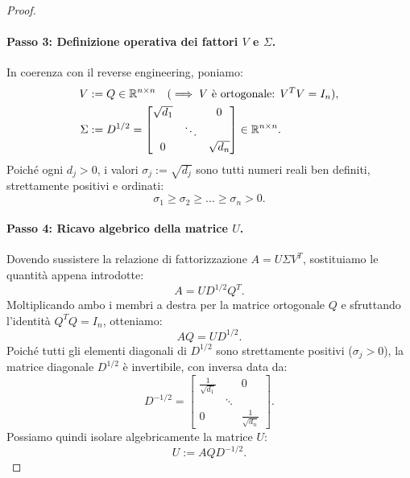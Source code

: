 \begin{proof}
\paragraph{Passo 3: Definizione operativa dei fattori $V$ e $\Sigma$.}
In coerenza con il reverse engineering, poniamo:
\begin{align}
    V &:= Q \in \mathbb{R}^{n \times n} \quad (\implies V \text{ \`e ortogonale: } V^T V = I_n), \\
    \Sigma &:= D^{1/2} = \begin{bmatrix}
        \sqrt{d_1} & & 0 \\
        & \ddots & \\
        0 & & \sqrt{d_n}
    \end{bmatrix} \in \mathbb{R}^{n \times n}.
\end{align}
Poich\'e ogni $d_j > 0$, i valori $\sigma_j := \sqrt{d_j}$ sono tutti numeri reali ben definiti, strettamente positivi e ordinati:
\begin{equation}
    \sigma_1 \ge \sigma_2 \ge \dots \ge \sigma_n > 0.
\end{equation}

\paragraph{Passo 4: Ricavo algebrico della matrice $U$.}
Dovendo sussistere la relazione di fattorizzazione $A = U \Sigma V^T$, sostituiamo le quantit\`a appena introdotte:
\begin{equation}
    A = U D^{1/2} Q^T.
\end{equation}
Moltiplicando ambo i membri a destra per la matrice ortogonale $Q$ e sfruttando l'identit\`a $Q^T Q = I_n$, otteniamo:
\begin{equation}
    A Q = U D^{1/2}.
\end{equation}
Poich\'e tutti gli elementi diagonali di $D^{1/2}$ sono strettamente positivi ($\sigma_j > 0$), la matrice diagonale $D^{1/2}$ \`e invertibile, con inversa data da:
\begin{equation}
    D^{-1/2} = \begin{bmatrix}
        \frac{1}{\sqrt{d_1}} & & 0 \\
        & \ddots & \\
        0 & & \frac{1}{\sqrt{d_n}}
    \end{bmatrix}.
\end{equation}
Possiamo quindi isolare algebricamente la matrice $U$:
\begin{equation}
\label{eq:svd-costruzione-U}
    U := A Q D^{-1/2}.
\end{equation}


\end{proof}
